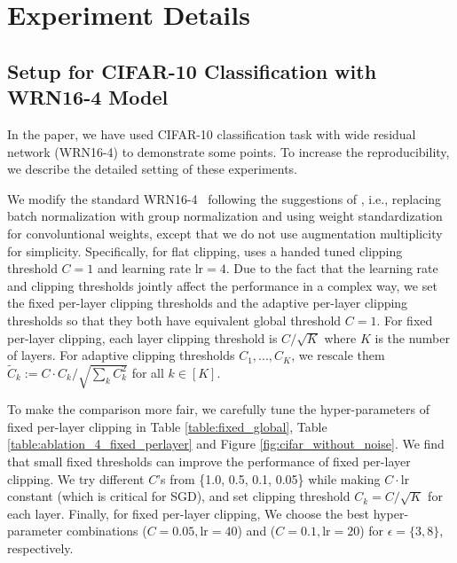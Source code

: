 \section{Experiment Details} \label{app:hyperparameter}

\subsection{Setup for CIFAR-10 Classification with WRN16-4 Model} \label{app:cifar}

In the paper, we have used CIFAR-10 classification task with wide residual network (WRN16-4) to demonstrate some points. To increase the reproducibility, we describe the detailed setting of these experiments.

We modify the standard WRN16-4~\citep{zagoruyko2016wide} following the suggestions of \cite{de2022unlocking}, i.e., replacing batch normalization with group normalization and using weight standardization for convoluntional weights, except that we do not use augmentation multiplicity for simplicity. Specifically, for flat clipping, \cite{de2022unlocking} uses a handed tuned clipping threshold $C=1$ and learning rate $\text{lr}=4$. Due to the fact that the learning rate and clipping thresholds jointly affect the performance in a complex way, we set the fixed per-layer clipping thresholds and the adaptive per-layer clipping thresholds so that they both have equivalent global threshold $C=1$. For fixed per-layer clipping, each layer clipping threshold is $C/\sqrt{K}$ where $K$ is the number of layers. For adaptive clipping thresholds $C_1, ..., C_K$, we rescale them $\tilde{C}_k := C \cdot C_k/\sqrt{\sum_k C_k^2}$ for all $k \in [K]$. 

To make the comparison more fair, we carefully tune the hyper-parameters of fixed per-layer clipping in Table \ref{table:fixed_global}, Table \ref{table:ablation_4_fixed_perlayer} and Figure \ref{fig:cifar_without_noise}. We find that small fixed thresholds can improve the performance of fixed per-layer clipping. We try different $C$'s from \{1.0, 0.5, 0.1, 0.05\} while making $C\cdot\text{lr}$ constant (which is critical for SGD), and set clipping threshold $C_k = C / \sqrt{K}$ for each layer. Finally, for fixed per-layer clipping, We choose the best hyper-parameter combinations ($C=0.05, \text{lr}=40$) and ($C=0.1, \text{lr}=20$) for $\epsilon=\{3,8\}$,  respectively.

